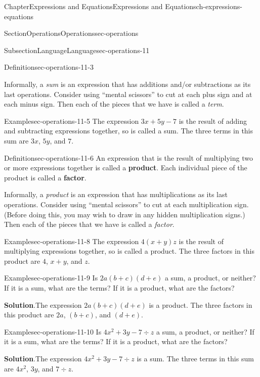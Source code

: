 \documentclass[twoside,11pt,]{book}
\newcommand{\blocktitlefont}{\relax}
\newcommand{\terminology}[1]{\textbf{#1}}
\numberwithin{equation}{chapter}
\begin{document}
\begin{chapterptx}{Chapter}{Expressions and Equations}{}{Expressions and Equations}{}{}{ch-expressions-equations}
\begin{sectionptx}{Section}{Operations}{}{Operations}{}{}{sec-operations}
\begin{subsectionptx}{Subsection}{Language}{}{Language}{}{}{sec-operations-11}
\begin{definition}{Definition}{}{sec-operations-11-3}
\end{definition}
Informally, a \emph{sum} is an expression that has additions and\slash{}or subtractions as its last operations. Consider using ``mental scissors'' to cut at each plus sign and at each minus sign. Then each of the pieces that we have is called a \emph{term}.%
\begin{example}{Example}{}{sec-operations-11-5}%
The expression \(3x + 5y - 7\) is the result of adding and subtracting expressions together, so is called a sum. The three terms in this sum are \(3x\), \(5y\), and \(7\).%
\end{example}
\begin{definition}{Definition}{}{sec-operations-11-6}%
An expression that is the result of multiplying two or more expressions together is called a \terminology{product}. Each individual piece of the product is called a \terminology{factor}.%
\end{definition}
Informally, a \emph{product} is an expression that has multiplications as its last operations. Consider using ``mental scissors'' to cut at each multiplication sign. (Before doing this, you may wish to draw in any hidden multiplication signs.) Then each of the pieces that we have is called a \emph{factor}.%
\begin{example}{Example}{}{sec-operations-11-8}%
The expression \(4(x+y)z\) is the result of multiplying expressions together, so is called a product. The three factors in this product are \(4\), \(x+y\), and \(z\).%
\end{example}
\begin{example}{Example}{}{sec-operations-11-9}%
Is \(2a(b+c)(d+e)\) a sum, a product, or neither? If it is a sum, what are the terms? If it is a product, what are the factors?%
\par\smallskip%
\noindent\textbf{\blocktitlefont Solution}.\hypertarget{sec-operations-11-9-2}{}\quad{}The expression \(2a(b+c)(d+e)\) is a product. The three factors in this product are \(2a\), \((b+c)\), and \((d+e)\).%
\end{example}
\begin{example}{Example}{}{sec-operations-11-10}%
Is \(4x^2 + 3y - 7\div z\) a sum, a product, or neither? If it is a sum, what are the terms? If it is a product, what are the factors?%
\par\smallskip%
\noindent\textbf{\blocktitlefont Solution}.\hypertarget{sec-operations-11-10-2}{}\quad{}The expression \(4x^2 + 3y - 7\div z\) is a sum. The three terms in this sum are \(4x^2\), \(3y\), and \(7\div z\).%

\end{example}
\end{subsectionptx}
\end{sectionptx}
\end{chapterptx}
\end{document}
